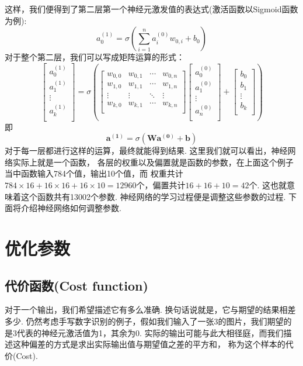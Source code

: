 \documentclass[UTF8]{ctexbook}
\begin{document}
这样，我们便得到了第二层第一个神经元激发值的表达式(激活函数以Sigmoid函数为例):
\[a_0^{(1)}=\sigma\left(\sum_{i=1} ^{n}a_{i}^{(0)}w_{0,i}+b_0\right)\]
对于整个第二层，我们可以写成矩阵运算的形式：
\[
\begin{bmatrix}
    a_0^{(1)} \\
    a_1^{(1)} \\
    \vdots \\
    a_k^{(1)} \\
\end{bmatrix}
=
\sigma \left(
\begin{bmatrix}
    w_{0,0} & w_{0,1} & \cdots & w_{0,n} \\
    w_{1,0} & w_{1,1} & \cdots & w_{1,n} \\
    \vdots & \vdots & \ddots & \vdots \\
    w_{k,0} & w_{k,1} & \cdots & w_{k,n} \\
\end{bmatrix}
\begin{bmatrix}
    a_0^{(0)} \\
    a_1^{(0)} \\
    \vdots \\
    a_n^{(0)} \\
\end{bmatrix}
+
\begin{bmatrix}
    b_0 \\
    b_1 \\
    \vdots \\
    b_k \\
\end{bmatrix}
\right)
\]
即
\[\mathbf{a^{(1)}}=\sigma\left(\mathbf{W}\mathbf{a^{(0)}}+\mathbf{b}\right)\]
对于每一层都进行这样的运算，最终就能得到结果. 这里我们就可以看出，神经网络实际上就是一个函数，
各层的权重以及偏置就是函数的参数，在上面这个例子当中函数输入784个值，输出10个值，而
权重共计$784\times 16+16\times 16+16\times 10=12960$个，偏置共计$16+16+10=42$个. 
这也就意味着这个函数共有13002个参数. 神经网络的学习过程便是调整这些参数的过程. 
下面将介绍神经网络如何调整参数.
\section{优化参数}
\subsection{代价函数(Cost function)}
对于一个输出，我们希望描述它有多么准确. 换句话说就是，它与期望的结果相差多少. 
仍然考虑手写数字识别的例子，假如我们输入了一张3的图片，我们期望的是3代表的神经元激活值为1，其余为0. 
实际的输出可能与此大相径庭，而我们描述这种偏差的方式是求出实际输出值与期望值之差的平方和，
称为这个样本的代价(Cost).
\end{document}
